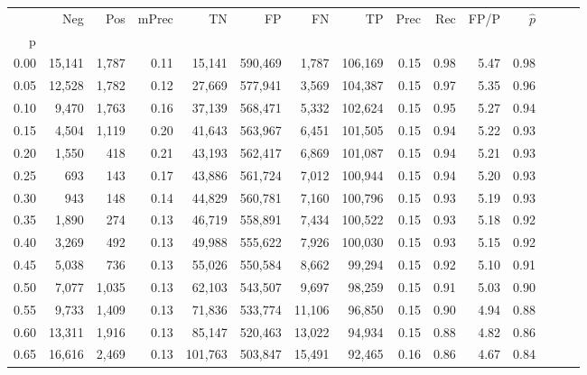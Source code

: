 \begin{tabular}{rrrrrrrrrrrrrrr}
\toprule
{} &      Neg &     Pos & mPrec &       TN &       FP &       FN &       TP &  Prec &   Rec &  FP/P & $\hat{p}$ \\
p    &          &         &       &          &          &          &          &       &       &       &           \\
\midrule
0.00 &   15,141 &   1,787 &  0.11 &   15,141 &  590,469 &    1,787 &  106,169 &  0.15 &  0.98 &  5.47 &      0.98 \\
0.05 &   12,528 &   1,782 &  0.12 &   27,669 &  577,941 &    3,569 &  104,387 &  0.15 &  0.97 &  5.35 &      0.96 \\
0.10 &    9,470 &   1,763 &  0.16 &   37,139 &  568,471 &    5,332 &  102,624 &  0.15 &  0.95 &  5.27 &      0.94 \\
0.15 &    4,504 &   1,119 &  0.20 &   41,643 &  563,967 &    6,451 &  101,505 &  0.15 &  0.94 &  5.22 &      0.93 \\
0.20 &    1,550 &     418 &  0.21 &   43,193 &  562,417 &    6,869 &  101,087 &  0.15 &  0.94 &  5.21 &      0.93 \\
0.25 &      693 &     143 &  0.17 &   43,886 &  561,724 &    7,012 &  100,944 &  0.15 &  0.94 &  5.20 &      0.93 \\
0.30 &      943 &     148 &  0.14 &   44,829 &  560,781 &    7,160 &  100,796 &  0.15 &  0.93 &  5.19 &      0.93 \\
0.35 &    1,890 &     274 &  0.13 &   46,719 &  558,891 &    7,434 &  100,522 &  0.15 &  0.93 &  5.18 &      0.92 \\
0.40 &    3,269 &     492 &  0.13 &   49,988 &  555,622 &    7,926 &  100,030 &  0.15 &  0.93 &  5.15 &      0.92 \\
0.45 &    5,038 &     736 &  0.13 &   55,026 &  550,584 &    8,662 &   99,294 &  0.15 &  0.92 &  5.10 &      0.91 \\
0.50 &    7,077 &   1,035 &  0.13 &   62,103 &  543,507 &    9,697 &   98,259 &  0.15 &  0.91 &  5.03 &      0.90 \\
0.55 &    9,733 &   1,409 &  0.13 &   71,836 &  533,774 &   11,106 &   96,850 &  0.15 &  0.90 &  4.94 &      0.88 \\
0.60 &   13,311 &   1,916 &  0.13 &   85,147 &  520,463 &   13,022 &   94,934 &  0.15 &  0.88 &  4.82 &      0.86 \\
0.65 &   16,616 &   2,469 &  0.13 &  101,763 &  503,847 &   15,491 &   92,465 &  0.16 &  0.86 &  4.67 &      0.84 \\

\end{tabular}
